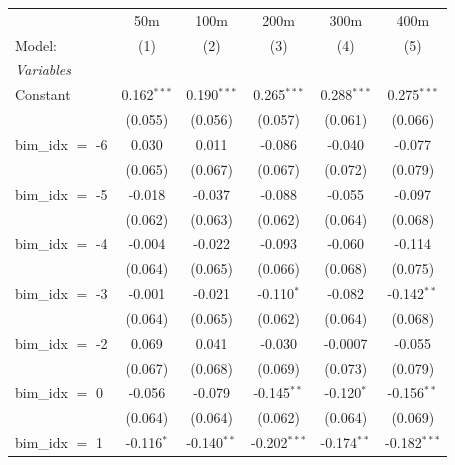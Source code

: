 
\begingroup
\centering
\begin{tabular}{lccccc}
   \tabularnewline \midrule \midrule
                       & 50m            & 100m           & 200m           & 300m           & 400m \\   
   Model:              & (1)            & (2)            & (3)            & (4)            & (5)\\  
   \midrule
   \emph{Variables}\\
   Constant            & 0.162$^{***}$  & 0.190$^{***}$  & 0.265$^{***}$  & 0.288$^{***}$  & 0.275$^{***}$\\   
                       & (0.055)        & (0.056)        & (0.057)        & (0.061)        & (0.066)\\   
   bim\_idx $=$ -6     & 0.030          & 0.011          & -0.086         & -0.040         & -0.077\\   
                       & (0.065)        & (0.067)        & (0.067)        & (0.072)        & (0.079)\\   
   bim\_idx $=$ -5     & -0.018         & -0.037         & -0.088         & -0.055         & -0.097\\   
                       & (0.062)        & (0.063)        & (0.062)        & (0.064)        & (0.068)\\   
   bim\_idx $=$ -4     & -0.004         & -0.022         & -0.093         & -0.060         & -0.114\\   
                       & (0.064)        & (0.065)        & (0.066)        & (0.068)        & (0.075)\\   
   bim\_idx $=$ -3     & -0.001         & -0.021         & -0.110$^{*}$   & -0.082         & -0.142$^{**}$\\   
                       & (0.064)        & (0.065)        & (0.062)        & (0.064)        & (0.068)\\   
   bim\_idx $=$ -2     & 0.069          & 0.041          & -0.030         & -0.0007        & -0.055\\   
                       & (0.067)        & (0.068)        & (0.069)        & (0.073)        & (0.079)\\   
   bim\_idx $=$ 0      & -0.056         & -0.079         & -0.145$^{**}$  & -0.120$^{*}$   & -0.156$^{**}$\\   
                       & (0.064)        & (0.064)        & (0.062)        & (0.064)        & (0.069)\\   
   bim\_idx $=$ 1      & -0.116$^{*}$   & -0.140$^{**}$  & -0.202$^{***}$ & -0.174$^{**}$  & -0.182$^{***}$\\   

\end{tabular}
